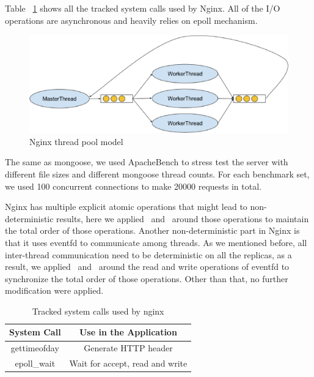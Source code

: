 Table ~\ref{t:nginx_syscall} shows all the tracked system calls used by Nginx. All of the I/O operations are asynchronous and heavily relies on epoll mechanism. 

\begin{figure}
\centering
\includegraphics[width=0.8\columnwidth]{figures/nginx_model}
\caption{Nginx thread pool model}
\label{f:nginx_model}
\end{figure}

The same as mongoose, we used ApacheBench to stress test the server with different file sizes and different mongoose thread counts. For each benchmark set, we used 100 concurrent connections to make 20000 requests in total.

Nginx has multiple explicit atomic operations that might lead to non-deterministic results, here we applied \detstart\ and \detend\ around those operations to maintain the total order of those operations. Another non-deterministic part in Nginx is that it uses eventfd to communicate among threads. As we mentioned before, all inter-thread communication need to be deterministic on all the replicas, as a result, we applied \detstart\ and \detend\ around the read and write operations of eventfd to synchronize the total order of those operations. Other than that, no further modification were applied.

\begin{table}
\caption{Tracked system calls used by nginx}
\begin{center}
 \begin{tabular}{c | c }
System Call & Use in the Application\\ \hline
 gettimeofday & Generate HTTP header\\ \hline
 epoll\_wait & Wait for accept, read and write
 \end{tabular}
\end{center}
\label{t:nginx_syscall}
\end{table}

